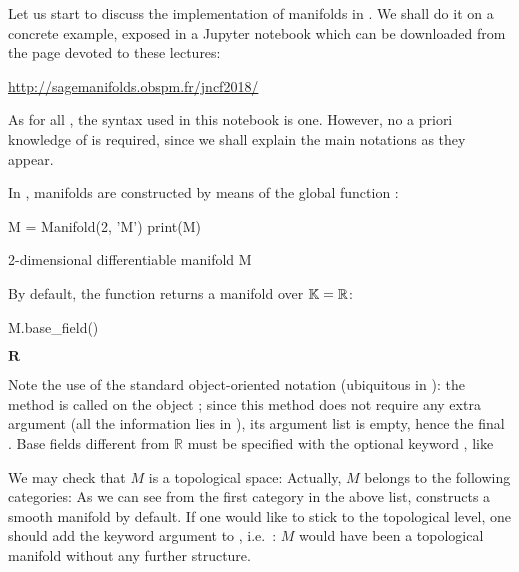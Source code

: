 Let us start to discuss the implementation of manifolds in \Sage{}. We shall
do it on a concrete example, exposed in a Jupyter notebook which can be downloaded
from the page devoted to these lectures:
\begin{center}
\url{http://sagemanifolds.obspm.fr/jncf2018/}
\end{center}
As for all \Sage{}, the syntax used in this notebook is  one. However, no
a priori knowledge of  is required, since we shall explain the
main notations as they appear.

In \Sage{}, manifolds are constructed by means of the global function :

\begin{NBin}
\end{NBin}

\begin{NBin}
M = Manifold(2, 'M')
print(M)
\end{NBin}
\begin{NBprint}
2-dimensional differentiable manifold M
\end{NBprint}
By default, the function  returns a manifold over $\mathbb{K}=\mathbb{R}$:
\begin{NBin}
M.base_field()
\end{NBin}
\begin{NBout}
$\mathbf{R}$
\end{NBout}
Note the use of the standard object-oriented notation (ubiquitous in
): the method  is called on the object ;
since this method does not require any extra argument (all the information lies
in ), its argument list is empty, hence the final \code{()}.
Base fields different from $\mathbb{R}$
must be specified with the optional keyword , like
\begin{flushleft}
\end{flushleft}
We may check that $M$ is a topological space:
Actually, $M$ belongs to the following categories:
As we can see from the first category in the above list, 
constructs a smooth manifold by default.
If one would like to stick to the topological level, one should add
the keyword argument  to ,
i.e.\ : $M$ would have
been a topological manifold without any further structure.

